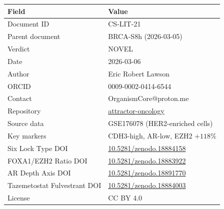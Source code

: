 \documentclass[12pt, a4paper]{article}
\begin{document}
\begin{tabular}{ll}
\toprule
\textbf{Field} & \textbf{Value} \\
\midrule
Document ID & CS-LIT-21 \\
Parent document & BRCA-S8h (2026-03-05) \\
Verdict & NOVEL \\
Date & 2026-03-06 \\
Author & Eric Robert Lawson \\
ORCID & 0009-0002-0414-6544 \\
Contact & OrganismCore@proton.me \\
Repository &
\href{https://github.com/Eric-Robert-Lawson/attractor-oncology}
{attractor-oncology} \\
Source data & GSE176078 (HER2-enriched cells) \\
Key markers &
CDH3-high, AR-low, EZH2 $+118\%$ \\
Six Lock Type DOI &
\href{https://doi.org/10.5281/zenodo.18884158}
{10.5281/zenodo.18884158} \\
FOXA1/EZH2 Ratio DOI &
\href{https://doi.org/10.5281/zenodo.18883922}
{10.5281/zenodo.18883922} \\
AR Depth Axis DOI &
\href{https://doi.org/10.5281/zenodo.18891770}
{10.5281/zenodo.18891770} \\
Tazemetostat Fulvestrant DOI &
\href{https://doi.org/10.5281/zenodo.18884003}
{10.5281/zenodo.18884003} \\
License & CC BY 4.0 \\
\bottomrule
\end{tabular}
\end{document}
